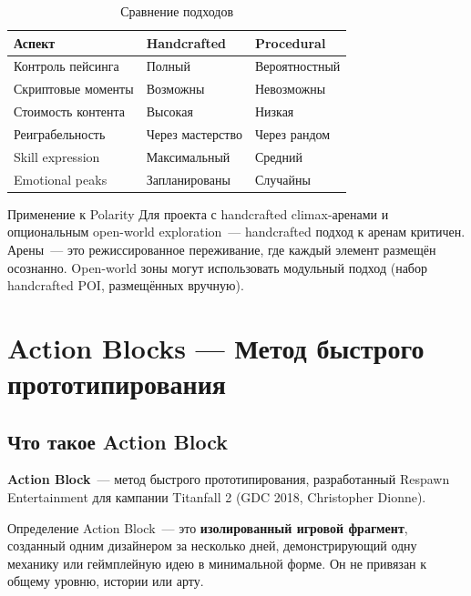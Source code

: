 \documentclass[a4paper,11pt]{report}
\begin{document}
\begin{table}[H]
\centering
\caption{Сравнение подходов}
\begin{tabularx}{\textwidth}{@{}lXX@{}}
\toprule
\textbf{Аспект} & \textbf{Handcrafted} & \textbf{Procedural} \\
\midrule
Контроль пейсинга & Полный & Вероятностный \\
Скриптовые моменты & Возможны & Невозможны \\
Стоимость контента & Высокая & Низкая \\
Реиграбельность & Через мастерство & Через рандом \\
Skill expression & Максимальный & Средний \\
Emotional peaks & Запланированы & Случайны \\
\bottomrule
\end{tabularx}
\end{table}

\begin{polarity}{Применение к Polarity}
Для проекта с handcrafted climax-аренами и опциональным open-world
exploration~--- handcrafted подход к аренам критичен. Арены~--- это
режиссированное переживание, где каждый элемент размещён осознанно.
Open-world зоны могут использовать модульный подход (набор handcrafted
POI, размещённых вручную).
\end{polarity}


\chapter{Action Blocks --- Метод быстрого прототипирования}

\section{Что такое Action Block}

\textbf{Action Block}~--- метод быстрого прототипирования, разработанный
Respawn Entertainment для кампании Titanfall 2 (GDC 2018,
Christopher Dionne).

\begin{principle}{Определение}
Action Block~--- это \textbf{изолированный игровой фрагмент}, созданный одним
дизайнером за несколько дней, демонстрирующий одну механику или
геймплейную идею в минимальной форме. Он не привязан к общему уровню,
истории или арту.
\end{principle}
\end{document}
